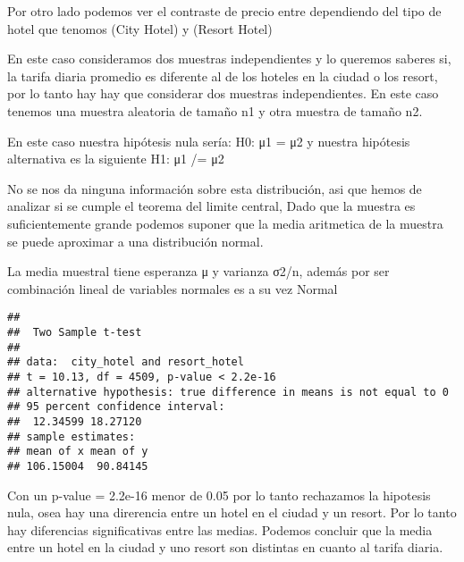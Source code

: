 \documentclass[]{article}
\newenvironment{Shaded}{\begin{snugshade}}{\end{snugshade}}
\newcommand{\DataTypeTok}[1]{\textcolor[rgb]{0.13,0.29,0.53}{#1}}
\newcommand{\FloatTok}[1]{\textcolor[rgb]{0.00,0.00,0.81}{#1}}
\newcommand{\KeywordTok}[1]{\textcolor[rgb]{0.13,0.29,0.53}{\textbf{#1}}}
\newcommand{\NormalTok}[1]{#1}
\newcommand{\OperatorTok}[1]{\textcolor[rgb]{0.81,0.36,0.00}{\textbf{#1}}}
\newcommand{\OtherTok}[1]{\textcolor[rgb]{0.56,0.35,0.01}{#1}}
\newcommand{\StringTok}[1]{\textcolor[rgb]{0.31,0.60,0.02}{#1}}
\begin{document}
Por otro lado podemos ver el contraste de precio entre dependiendo del
tipo de hotel que tenomos (City Hotel) y (Resort Hotel)

En este caso consideramos dos muestras independientes y lo queremos
saberes si, la tarifa diaria promedio es diferente al de los hoteles en
la ciudad o los resort, por lo tanto hay hay que considerar dos muestras
independientes. En este caso tenemos una muestra aleatoria de tamaño n1
y otra muestra de tamaño n2.

En este caso nuestra hipótesis nula sería: H0: μ1 = μ2 y nuestra
hipótesis alternativa es la siguiente H1: μ1 /= μ2

No se nos da ninguna información sobre esta distribución, asi que hemos
de analizar si se cumple el teorema del limite central, Dado que la
muestra es suficientemente grande podemos suponer que la media
aritmetica de la muestra se puede aproximar a una distribución normal.

La media muestral tiene esperanza μ y varianza σ2/n, además por ser
combinación lineal de variables normales es a su vez Normal

\begin{Shaded}
\end{Shaded}

\begin{verbatim}
## 
##  Two Sample t-test
## 
## data:  city_hotel and resort_hotel
## t = 10.13, df = 4509, p-value < 2.2e-16
## alternative hypothesis: true difference in means is not equal to 0
## 95 percent confidence interval:
##  12.34599 18.27120
## sample estimates:
## mean of x mean of y 
## 106.15004  90.84145
\end{verbatim}

Con un p-value = 2.2e-16 menor de 0.05 por lo tanto rechazamos la
hipotesis nula, osea hay una direrencia entre un hotel en el ciudad y un
resort. Por lo tanto hay diferencias significativas entre las medias.
Podemos concluir que la media entre un hotel en la ciudad y uno resort
son distintas en cuanto al tarifa diaria.
\end{document}
